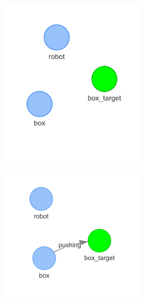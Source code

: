 \begin{figure}[H]
    \centering
    \begin{subfigure}{.3\textwidth}
    \centering
    \includegraphics[width=0.8\textwidth]{figures/proposed_method/connecting_nodes/robot_push/robot_push_1}
    \caption{}\label{subfig:robot_push_1}
    \end{subfigure}
    \begin{subfigure}{.3\textwidth}
    \centering
    \includegraphics[width=0.8\textwidth]{figures/proposed_method/connecting_nodes/robot_push/robot_push_2_new}

\end{subfigure}
\end{figure}
